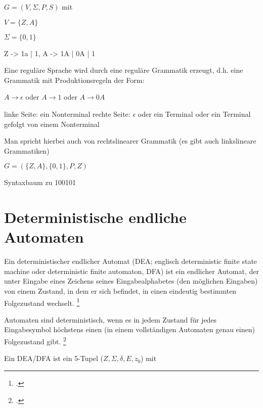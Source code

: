 \documentclass{lehramt-informatik-haupt}
\begin{document}
$G = (V, \Sigma, P, S)$ mit

$V = \{Z, A\}$

$\Sigma = \{0, 1\}$

\begin{liProduktionsRegeln}
Z -> 1a | 1,
A -> 1A | 0A | 1
\end{liProduktionsRegeln}

Eine reguläre Sprache wird durch eine reguläre
Grammatik erzeugt, d.h. eine Grammatik mit
Produktionsregeln der Form:

$A \rightarrow \epsilon$ oder $A \rightarrow 1$ oder $A \rightarrow 0A$

linke Seite: ein Nonterminal rechte Seite: $\epsilon$ oder ein Terminal
oder ein Terminal gefolgt von einem Nonterminal

Man spricht hierbei auch von rechtslinearer Grammatik (es gibt auch
linkslineare Grammatiken)

$G = (\{Z, A\}, \{0, 1\}, P, Z)$

Syntaxbaum zu 100101
\begin{center}
\end{center}

%

\section{Deterministische endliche Automaten}

Ein deterministischer endlicher Automat (DEA; englisch deterministic
finite state machine oder deterministic finite automaton, DFA) ist ein
endlicher Automat, der unter Eingabe eines Zeichens seines
Eingabealphabetes (den möglichen Eingaben) von einem Zustand, in dem er
sich befindet, in einen eindeutig bestimmten Folgezustand wechselt.
\footcite{wiki:dea}

Automaten sind deterministisch, wenn es in jedem Zustand für jedes
Eingabesymbol höchstens einen (in einem vollständigen Automaten genau
einen) Folgezustand gibt.
\footcite[Seite 28]{vossen}

Ein DEA/DFA ist ein 5-Tupel ($Z, \Sigma, \delta, E, z_0$) mit
\end{document}
